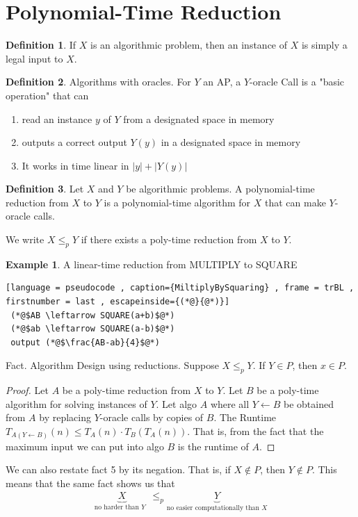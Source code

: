 \documentclass[a4paper]{article}
\theoremstyle{plain}
\theoremstyle{definition}
\newtheorem{defn}{Definition}[section]
\newtheorem{exmp}{Example}[section]
\theoremstyle{remark}
\begin{document}
\section{Polynomial-Time Reduction}
\begin{defn}
	If $X$ is an algorithmic problem, then an instance of $X$ is simply a legal input to $X$.
\end{defn}
\begin{defn}
	Algorithms with oracles. For $Y$ an AP, a $Y$-oracle Call is a "basic operation" that can
	\begin{enumerate}
		\item read an instance $y$ of $Y$ from a designated space in memory
		\item outputs a correct output $Y(y)$ in a designated space in memory
		\item It works in time linear in $|y| + |Y(y)|$
	\end{enumerate}
\end{defn}
\begin{defn}
	Let $X$ and $Y$ be algorithmic problems. A polynomial-time reduction from $X$ to $Y$ is a polynomial-time algorithm for $X$ that can make $Y$-oracle calls.
\end{defn}
We write $X \le_p Y$ if there exists a poly-time reduction from $X$ to $Y$.
\begin{exmp}
	A linear-time reduction from MULTIPLY to SQUARE
	\begin{lstlisting}[language = pseudocode , caption={MiltiplyBySquaring} , frame = trBL , firstnumber = last , escapeinside={(*@}{@*)}]
 (*@$AB \leftarrow SQUARE(a+b)$@*) 
 (*@$ab \leftarrow SQUARE(a-b)$@*)
 output (*@$\frac{AB-ab}{4}$@*)
	\end{lstlisting}
\end{exmp}
	Fact. Algorithm Design using reductions. Suppose $X \le_p Y$. If $Y \in P$, then $x \in P$.
	\begin{proof}
		Let $A$ be a poly-time reduction from $X$ to $Y$. Let $B$ be a poly-time algorithm for solving instances of $Y$. Let algo $A$ where all $Y \leftarrow B$ be obtained from $A$ by replacing $Y$-oracle calls by copies of $B$. The Runtime $T_{A(Y \leftarrow B)}(n) \le T_A(n) \cdot T_B(T_A(n))$. That is, from the fact that the maximum input we can put into algo $B$ is the runtime of $A$.
	\end{proof}
	We can also restate fact 5 by its negation. That is, if $X \not\in P$, then $Y \not\in P$. This means that the same fact shows us that 
	\begin{align*}
		\underbrace{X}_{\text{no harder than $Y$ }} \le_p \underbrace{Y}_{\text{no easier computationally than $X$}}
	\end{align*}
\end{document}

